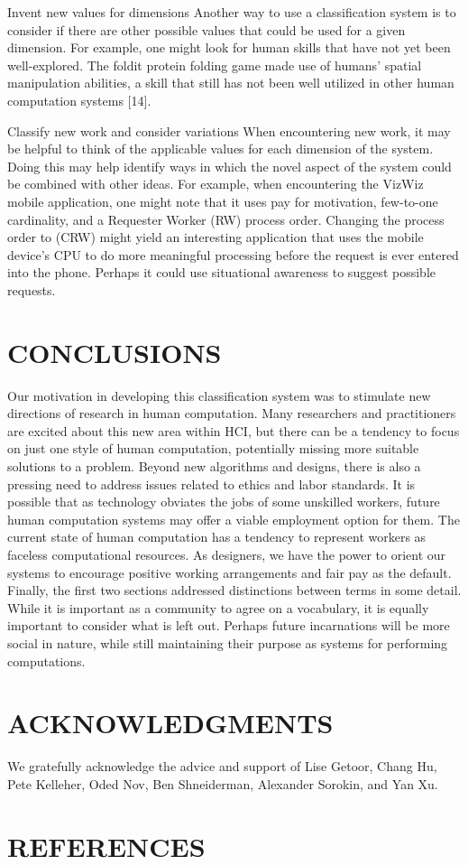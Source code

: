 \documentclass{acm_proc_article-sp} %
\begin{document}
Invent new values for dimensions Another way to use a classification system is to consider if there are other possible values that could be used for a given dimension. For example, one might look for human skills that have not yet been well-explored. The foldit protein folding game made use of humans' spatial manipulation abilities, a skill that still has not been well utilized in other human computation systems [14]. 

Classify new work and consider variations When encountering new work, it may be helpful to think of the applicable values for each dimension of the system. Doing this may help identify ways in which the novel aspect of the system could be combined with other ideas. For example, when encountering the VizWiz mobile application, one might note that it uses pay for motivation,  few-to-one cardinality, and a RequesterWorker (RW) process order. Changing the process order to (CRW) might yield an interesting application that uses the mobile device’s CPU to do more meaningful processing before the request is ever entered into the phone. Perhaps it could use situational awareness to suggest possible requests.

\section{CONCLUSIONS}
 Our motivation in developing this classification system was to stimulate new directions of research in human computation. Many researchers and practitioners are excited about this new area within HCI, but there can be a tendency to focus on just one style of human computation, potentially missing more suitable solutions to a problem. Beyond new algorithms and designs, there is also a pressing need to address issues related to ethics and labor standards. It is possible that as technology obviates the jobs of some unskilled workers, future human computation systems may offer a viable employment option for them.  The current state of human computation has a tendency to represent workers as faceless computational resources.  As designers, we have the power to orient our systems to encourage positive  working arrangements and fair pay as the default. Finally, the first two sections addressed distinctions between terms in some detail. While it is important as a community to agree on a vocabulary, it is equally important to consider what is left out. Perhaps future incarnations will be more social in nature, while still maintaining their purpose as systems for performing computations. 

\section{ACKNOWLEDGMENTS}
 We gratefully acknowledge the advice and support of Lise Getoor, Chang Hu, Pete Kelleher, Oded Nov, Ben Shneiderman, Alexander Sorokin, and Yan Xu. 

\section{REFERENCES}







\balancecolumns
\end{document}
